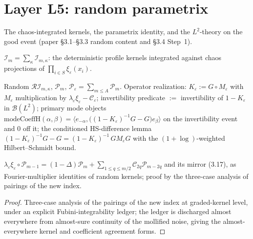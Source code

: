 \chapter{Layer L5: random parametrix}\label{ch:parametrix}

The chaos-integrated kernels, the parametrix identity, and the
\(L^2\)-theory on the good event (paper \S3.1--\S3.3 random content and
\S3.4 Step~1).

\begin{definition}\label{D-Im}
  \leanok
  \(\mathcal{I}_m = \sum_\kappa \mathcal{I}_{m,\kappa}\): the
  deterministic profile kernels integrated against chaos projections of
  \(\prod_{i\in S}\xi_\varepsilon(x_i)\).
\end{definition}

\begin{definition}\label{D-para}
  \leanok
  Random \(\mathcal{RI}_{m,\kappa}\), \(\mathcal{P}_m\),
  \(\mathcal{P}_\varepsilon = \sum_{m\le A}\mathcal{P}_m\). Operator
  realization: \(K_\varepsilon := G \circ M_\varepsilon\) with
  \(M_\varepsilon\) multiplication by
  \(\lambda_\varepsilon\xi_\varepsilon - \mathcal{C}_\varepsilon\);
  invertibility predicate \(:=\) invertibility of \(1 - K_\varepsilon\) in
  \(\mathcal{B}(L^2)\); primary mode objects
  \(\mathrm{modeCoeffH}(\alpha,\beta) = \big\langle e_{-\alpha},
  \big((1-K_\varepsilon)^{-1}G - G\big)e_\beta\big\rangle\) on the
  invertibility event and \(0\) off it; the conditioned HS-difference
  lemma \((1-K_\varepsilon)^{-1}G - G =
  (1-K_\varepsilon)^{-1}\,G M_\varepsilon G\) with the
  \((1+\log)\)-weighted Hilbert--Schmidt bound.
\end{definition}

\begin{proposition}\label{P-3.4}
  \leanok
  \(\lambda_\varepsilon\xi_\varepsilon\circ\mathcal{P}_{m-1}
  = (1-\Delta)\mathcal{P}_m + \sum_{1\le q\le m/2}
  \mathcal{C}_{2q}\mathcal{P}_{m-2q}\) and its mirror (3.17), as
  Fourier-multiplier identities of random kernels; proof by the
  three-case analysis of pairings of the new index.
\end{proposition}
\begin{proof}\leanok
  Three-case analysis of the pairings of the new index at graded-kernel
  level, under an explicit Fubini-integrability ledger; the ledger is
  discharged almost everywhere from almost-sure continuity of the
  mollified noise, giving the almost-everywhere kernel and coefficient
  agreement forms.
\end{proof}

